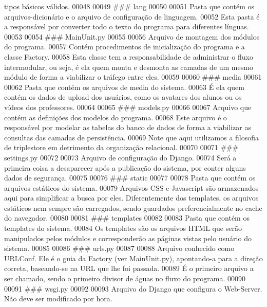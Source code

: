 \begin{DoxyCode}
       tipos básicos válidos.
00048 
00049 ### lang
00050 
00051 Pasta que contém os arquivos-dicionário e o arquivo de configuração de linguagem.
00052 Esta pasta é a responsável por converter todo o texto do programa para diferentes línguas.
00053 
00054 ### MainUnit.py
00055 
00056 Arquivo de montagem dos módulos do programa.
00057 Contém procedimentos de inicialização do programa e a classe Factory.
00058 Esta classe tem a responsabilidade de administrar o fluxo intermodular, ou seja, é ela quem monta e
       desmonta as camadas de um mesmo módulo de forma a viabilizar o tráfego entre eles.
00059 
00060 ### media
00061 
00062 Pasta que contém os arquivos de media do sistema.
00063 É ela quem contém os dados de upload dos usuários, como os avatares dos alunos ou os vídeos dos
       professores.
00064 
00065 ### models.py
00066 
00067 Arquivo que contém as definições dos modelos do programa.
00068 Este arquivo é o responsável por modelar as tabelas do banco de dados de forma a viabilizar as
       consultas das camadas de persistência.
00069 Note que aqui utilizamos a filosofia de triplestore em detrimento da organização relacional.
00070 
00071 ### settings.py
00072 
00073 Arquivo de configuração do Django.
00074 Será a primeira coisa a desaparecer após a publicação do sistema, por conter alguns dados de
       segurança.
00075 
00076 ### static
00077 
00078 Pasta que contém os arquivos estáticos do sistema.
00079 Arquivos CSS e Javascript são armazenados aqui para simplificar a busca por eles. Diferentemente dos
       templates, os arquivos estáticos nem sempre são carregados, sendo guardados preferencialmente no cache do
       navegador.
00080 
00081 ### templates
00082 
00083 Pasta que contém os templates do sistema.
00084 Os templates são os arquivos HTML que serão manipulados pelos módulos e corresponderão as páginas
       vistas pelo usuário do sistema.
00085 
00086 ### urls.py
00087 
00088 Arquivo conhecido como URLConf. Ele é o guia da Factory (ver MainUnit.py), apontando-a para a direção
       correta, baseando-se na URL que lhe foi passada.
00089 É o primeiro arquivo a ser chamado, sendo o primeiro divisor de águas no fluxo do programa.
00090 
00091 ### wsgi.py
00092 
00093 Arquivo do Django que configura o Web-Server. Não deve ser modificado por hora.
\end{DoxyCode}
